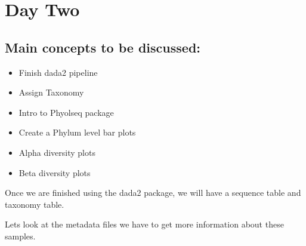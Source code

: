 \documentclass[
]{book}
\newenvironment{Shaded}{\begin{snugshade}}{\end{snugshade}}
\newcommand{\CharTok}[1]{\textcolor[rgb]{0.31,0.60,0.02}{#1}}
\newcommand{\DataTypeTok}[1]{\textcolor[rgb]{0.13,0.29,0.53}{#1}}
\newcommand{\KeywordTok}[1]{\textcolor[rgb]{0.13,0.29,0.53}{\textbf{#1}}}
\newcommand{\NormalTok}[1]{#1}
\newcommand{\OperatorTok}[1]{\textcolor[rgb]{0.81,0.36,0.00}{\textbf{#1}}}
\newcommand{\StringTok}[1]{\textcolor[rgb]{0.31,0.60,0.02}{#1}}
\providecommand{\tightlist}{%
  \setlength{\itemsep}{0pt}\setlength{\parskip}{0pt}}
\begin{document}
\hypertarget{day-two}{%
\chapter{Day Two}\label{day-two}}

\hypertarget{main-concepts-to-be-discussed}{%
\section{Main concepts to be discussed:}\label{main-concepts-to-be-discussed}}

\begin{itemize}
\tightlist
\item
  Finish dada2 pipeline
\item
  Assign Taxonomy
\item
  Intro to Phyolseq package
\item
  Create a Phylum level bar plots
\item
  Alpha diversity plots
\item
  Beta diversity plots
\end{itemize}

Once we are finished using the dada2 package, we will have a sequence table and taxonomy table.

Lets look at the metadata files we have to get more information about these samples.

\begin{Shaded}
\end{Shaded}
\end{document}
